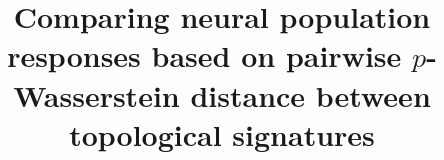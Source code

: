 \documentclass[11pt]{article}
\date{}
\begin{document}
%
\title{Comparing neural population responses based on pairwise $p$-Wasserstein distance between topological signatures}




% 


\end{document}

